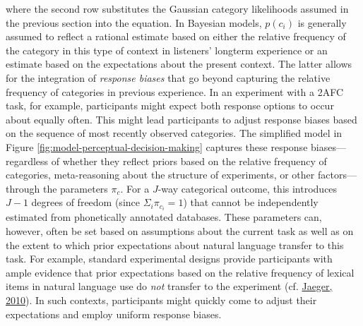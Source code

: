 \documentclass[
  11pt,
  english,
  man,floatsintext]{apa6}
\begin{document}
where the second row substitutes the Gaussian category likelihoods assumed in the previous section into the equation. In Bayesian models, \(p(c_i)\) is generally assumed to reflect a rational estimate based on either the relative frequency of the category in this type of context in listeners' longterm experience or an estimate based on the expectations about the present context. The latter allows for the integration of \emph{response biases} that go beyond capturing the relative frequency of categories in previous experience. In an experiment with a 2AFC task, for example, participants might expect both response options to occur about equally often. This might lead participants to adjust response biases based on the sequence of most recently observed categories. The simplified model in Figure \ref{fig:model-perceptual-decision-making} captures these response biases---regardless of whether they reflect priors based on the relative frequency of categories, meta-reasoning about the structure of experiments, or other factors---through the parameters \(\pi_{c}\).
For a \(J\)-way categorical outcome, this introduces \(J-1\) degrees of freedom (since \(\Sigma_i \pi_{c_i} = 1\)) that cannot be independently estimated from phonetically annotated databases. These parameters can, however, often be set based on assumptions about the current task as well as on the extent to which prior expectations about natural language transfer to this task. For example, standard experimental designs provide participants with ample evidence that prior expectations based on the relative frequency of lexical items in natural language use do \emph{not} transfer to the experiment (cf. \protect\hyperlink{ref-jaeger2010}{Jaeger, 2010}). In such contexts, participants might quickly come to adjust their expectations and employ uniform response biases.
\end{document}
